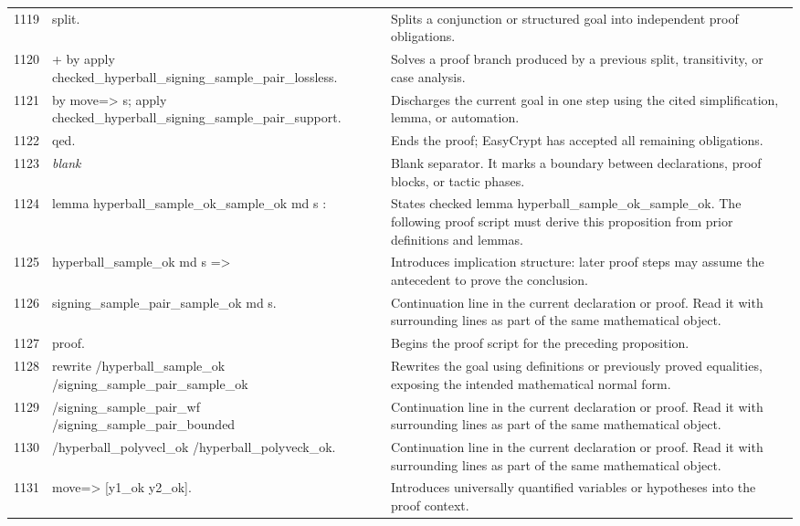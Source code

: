 \documentclass[10pt]{article}
\begin{document}
\begin{longtable}{r L{0.53\textwidth} L{0.37\textwidth}}
1119 & {\ttfamily\scriptsize split.} & Splits a conjunction or structured goal into independent proof obligations. \\
1120 & {\ttfamily\scriptsize + by apply checked\_hyperball\_signing\_sample\_pair\_lossless.} & Solves a proof branch produced by a previous split, transitivity, or case analysis. \\
1121 & {\ttfamily\scriptsize by move=> s; apply checked\_hyperball\_signing\_sample\_pair\_support.} & Discharges the current goal in one step using the cited simplification, lemma, or automation. \\
1122 & {\ttfamily\scriptsize qed.} & Ends the proof; EasyCrypt has accepted all remaining obligations. \\
1123 & {\ttfamily\scriptsize \emph{blank}} & Blank separator.  It marks a boundary between declarations, proof blocks, or tactic phases. \\
1124 & {\ttfamily\scriptsize lemma hyperball\_sample\_ok\_sample\_ok md s :} & States checked lemma hyperball\_sample\_ok\_sample\_ok.  The following proof script must derive this proposition from prior definitions and lemmas. \\
1125 & {\ttfamily\scriptsize   hyperball\_sample\_ok md s =>} & Introduces implication structure: later proof steps may assume the antecedent to prove the conclusion. \\
1126 & {\ttfamily\scriptsize   signing\_sample\_pair\_sample\_ok md s.} & Continuation line in the current declaration or proof.  Read it with surrounding lines as part of the same mathematical object. \\
1127 & {\ttfamily\scriptsize proof.} & Begins the proof script for the preceding proposition. \\
1128 & {\ttfamily\scriptsize rewrite /hyperball\_sample\_ok /signing\_sample\_pair\_sample\_ok} & Rewrites the goal using definitions or previously proved equalities, exposing the intended mathematical normal form. \\
1129 & {\ttfamily\scriptsize         /signing\_sample\_pair\_wf /signing\_sample\_pair\_bounded} & Continuation line in the current declaration or proof.  Read it with surrounding lines as part of the same mathematical object. \\
1130 & {\ttfamily\scriptsize         /hyperball\_polyvecl\_ok /hyperball\_polyveck\_ok.} & Continuation line in the current declaration or proof.  Read it with surrounding lines as part of the same mathematical object. \\
1131 & {\ttfamily\scriptsize move=> [y1\_ok y2\_ok].} & Introduces universally quantified variables or hypotheses into the proof context. \\

\end{longtable}
\end{document}
